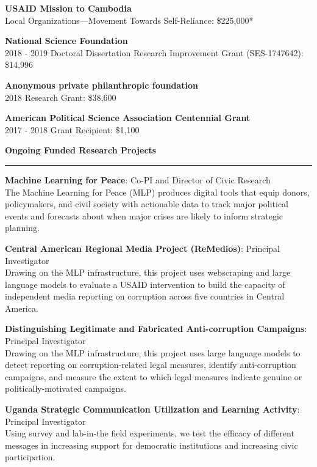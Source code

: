 \documentclass[11pt]{article}
\begin{document}
\textbf{USAID Mission to Cambodia}\\
Local Organizations—Movement Towards Self-Reliance: \$225,000*

\textbf{National Science Foundation}\\
2018 - 2019 Doctoral Dissertation Research Improvement Grant (SES-1747642): \$14,996

\textbf{Anonymous private philanthropic foundation}\\
2018 Research Grant: \$38,600

\textbf{American Political Science Association Centennial Grant}\\
2017 - 2018 Grant Recipient: \$1,100
\bigskip

\textbf{\large Ongoing Funded Research Projects}\\
\rule[3mm]{\textwidth}{.2pt}
\textbf{Machine Learning for Peace}: Co-PI and Director of Civic Research\\
The Machine Learning for Peace (MLP) produces digital tools that equip donors, policymakers, and civil society with actionable data to track major political events and forecasts about when major crises are likely to inform strategic planning. 

\textbf{Central American Regional Media Project (ReMedios)}: Principal Investigator\\
Drawing on the MLP infrastructure, this project uses webscraping and large language models to evaluate a USAID intervention to build the capacity of independent media reporting on corruption across five countries in Central America. 

\textbf{Distinguishing Legitimate and Fabricated Anti-corruption Campaigns}: Principal Investigator\\
Drawing on the MLP infrastructure, this project uses large language models to detect reporting on corruption-related legal measures, identify anti-corruption campaigns, and measure the extent to which legal measures indicate genuine or politically-motivated campaigns.  

\textbf{Uganda Strategic Communication Utilization and Learning Activity}: Principal Investigator\\
Using survey and lab-in-the field experiments, we test the efficacy of different messages in increasing support for democratic institutions and increasing civic participation. 


\end{document}
